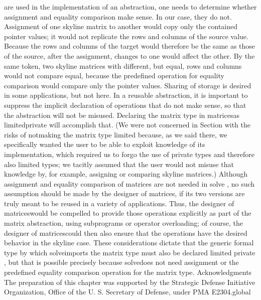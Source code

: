 are used in the implementation of an abstraction, one needs to determine
whether assignment and equality comparison make sense. In our case,
they do not. Assignment of one skyline matrix to another would copy
only the contained pointer values; it would not replicate the rows
and columns of the source value. Because the rows and columns of the
target would therefore be the same as those of the source, after the
assignment, changes to one would affect the other. By the same token,
two skyline matrices with different, but equal, rows and columns would
not compare equal, because the predefined operation for equality comparison
would compare only the pointer values. Sharing of storage is desired
in some applications, but not here. In a reusable abstraction, it
is important to suppress the implicit declaration of operations that
do not make sense, so that the abstraction will not be misused. Declaring
the matrix type in \tyxffmxmono[]matrices\tyxffmxendmono[] as %
\tyxffmxmono[]\tyxtstxbf[]limited\tyxtstxendbf[]%
\tyxffmxendmono[] \tyxffmxmono[]\tyxtstxbf[]private%
\tyxtstxendbf[]\tyxffmxendmono[] will accomplish that. (We were not
concerned in Section  with the
risks of \txtxemph[]not\txtxendemph[] making the matrix type limited
because, as we said there, we specifically wanted the user to be able
to exploit knowledge of its implementation, which required us to forgo
the use of private types and therefore also limited types; we tacitly
assumed that the user would not misuse that knowledge by, for example,
assigning or comparing skyline matrices.) Although assignment and
equality comparison of matrices are not needed in \tyxffmxmono[]solve%
\tyxffmxendmono[], no such assumption should be made by the designer
of \tyxffmxmono[]matrices\tyxffmxendmono[], if its two versions are
truly meant to be reused in a variety of applications. Thus, the designer
of \tyxffmxmono[]matrices\tyxffmxendmono[] would be compelled to provide
those operations explicitly as part of the matrix abstraction, using
subprograms or operator overloading; of course, the designer of %
\tyxffmxmono[]matrices\tyxffmxendmono[] could then also ensure that
the operations have the desired behavior in the skyline case. These
considerations dictate that the generic formal type by which %
\tyxffmxmono[]solve\tyxffmxendmono[] imports the matrix type must
also be declared \tyxffmxmono[]\tyxtstxbf[]limited%
\tyxtstxendbf[]\tyxffmxendmono[] \tyxffmxmono[]\tyxtstxbf[]private%
\tyxtstxendbf[]\tyxffmxendmono[], but that is possible precisely because
\tyxffmxmono[]solve\tyxffmxendmono[] does not need assignment or the
predefined equality comparison operation for the matrix type.%
\Endpara[]
\DivEndiv[]
\DivEndiii[]
\DivLiii[]Acknowledgments%
\HdMjEndiii[]
\Para[]The preparation of this chapter was supported by the Strategic
Defense Initiative Organization, Office of the U. S. Secretary of
Defense, under PMA E2304.\Endpara[]
\DivEndiii[]
\Bib[\BibHdPosPostvskp=7pt plus3pt minus1pt \BibHdPosPrevskp=20pt plus7pt minus4pt \def\BibHdFntTsz{H}\BibHspaceWAmt=26pt ]%
\Bibdat[]global\BibEnddat[]\Endbib[]
\DivEndii[]
\DivEndbod[]
\Enddoc[]

